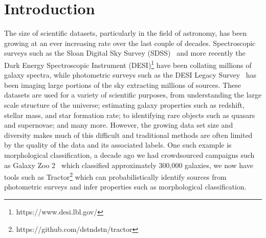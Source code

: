 
\section{Introduction}\label{sec:introduction}
The size of scientific datasets, particularly in the field of astronomy, has been growing at an ever increasing rate
over the last couple of decades.
Spectroscopic surveys such as the Sloan Digital Sky Survey (SDSS)~\citep{york2000} and more recently the Dark Energy
Spectroscopic Instrument (DESI)\footnote{https://www.desi.lbl.gov/} have been collating millions of galaxy spectra, while photometric
surveys such as the DESI Legacy Survey~\citep{desilegacy2018} has been imaging large portions of the sky extracting millions
of sources.
These datasets are used for a variety of scientific purposes, from understanding the large scale structure of the universe;
estimating galaxy properties such as redshift, stellar mass, and star formation rate; to identifying rare objects such as
quasars and supernovae; and many more.
However, the growing data set size and diversity makes much of this difficult and traditional methods are often
limited by the quality of the data and its associated labels.
One such example is morphological classification, a decade ago we had crowdsourced campaigns such as Galaxy Zoo 2~\citep{willet2013}
which classified approximately 300,000 galaxies, we now have tools such as Tractor\footnote{https://github.com/dstndstn/tractor}
which can probabilistically identify sources from photometric surveys and infer properties such as morphological classification.

